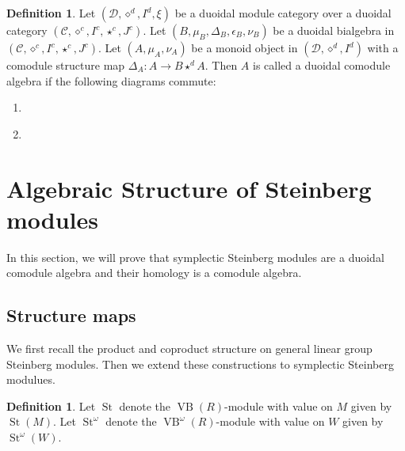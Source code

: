 \documentclass[11pt,letterpaper]{amsart}
\DeclareMathOperator{\VB}{VB}
\numberwithin{theoremcounter}{section}
\theoremstyle{definition}
\newtheorem{definition}[Defauto]{Definition}
\theoremstyle{remark}
\DeclareMathOperator{\St}{St}
\begin{document}
\begin{definition}  \label{duoidalcomodulealgebra}
Let  $(\mathcal{D},\diamond^d, I^d,\xi)$ be a  duoidal module category over a duoidal category $(\mathcal{C}, \diamond^c, I^c, \star^c, J^c)$.   Let $(B,\mu_B,\Delta_B,\epsilon_B,\nu_B)$ be a duoidal bialgebra in $(\mathcal{C}, \diamond^c, I^c, \star^c, J^c)$. Let $(A,\mu_A,\nu_A)$ be a monoid object in $(\mathcal{D},\diamond^d, I^d)$ with a comodule structure map $\Delta_A\colon A \to B \star^d A$. Then $A$ is called a duoidal comodule algebra if the following diagrams commute:
\begin{enumerate}
    \item    \label{duoidalcomodulealgebra1}
    \item  {}
\end{enumerate}

    
\end{definition}


\section{Algebraic Structure of Steinberg modules}
\label{StDuoidalSec}

In this section, we will prove that symplectic Steinberg modules are a duoidal comodule algebra and their homology is a comodule algebra. 

\subsection{Structure maps}

We first recall the product and coproduct structure on general linear group Steinberg modules. Then we extend these constructions to symplectic Steinberg modulues. 
\begin{definition}
    Let $\St$ denote the $\VB(R)$-module with value on $M$ given by $\St(M)$.     Let $\St^\omega$ denote the $\VB^\omega(R)$-module with value on $W$ given by $\St^\omega(W)$.
\end{definition}
\end{document}
